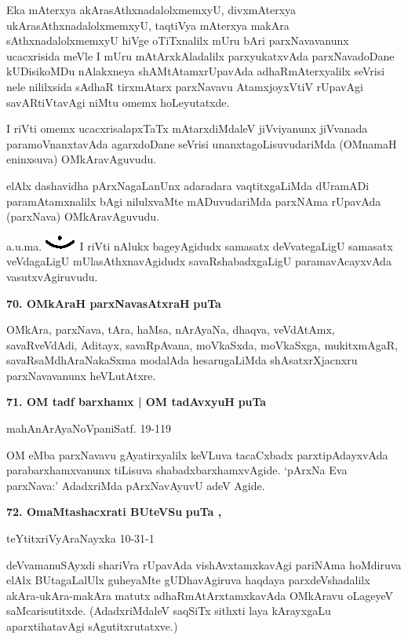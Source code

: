 \smallskip
Eka mAterxya akArasAthxnadalolxmemxyU, divxmAterxya ukArasAthxnada\-lolxmemxyU, taqtiVya mAterx\-ya makAra sAthxnadalolxmemxyU hiVge oTiTxnalilx mUru bAri parxNavavanunx ucacxrisida meVle I mUru mAtArxkAladalilx parxyukatxvAda parxNavadoDane kUDisikoMDu nAlakxneya shAMtAtamxrUpavAda adhaR\-mAterxyalilx seVrisi nele nililxsida sAdhaR tirxmAtarx parxNavavu AtamxjoyxVtiV rUpavAgi savARtiVtavAgi niMtu omemx hoLeyutatxde.

I riVti omemx ucacxrisalapxTaTx mAtarxdiMdaleV jiVviyanunx jiVvanada paramoVnanxtavAda agarxdoDane seVrisi unanxtagoLisuvudariMda (OMnamaH eninxsuva) OMkAravAguvudu.

elAlx dashavidha pArxNagaLanUnx adaradara vaqtitxgaLiMda dUramADi paramAtamxnalilx bAgi nilulxvaMte mADuvudariMda parxNAma rUpavAda (parxNava) OMkAravAguvudu.

a.u.ma. {\includegraphics[scale=.6]{fig1.eps}} I riVti nAlukx bageyAgidudx samasatx deVvategaLigU samasatx veVdagaLigU mUlasAthxna\-vAgidudx savaRshabadxgaLigU paramavAcayxvAda vasutxvAgiruvudu.

\medskip
\noindent
\textbf{70. OMkAraH parxNavasAtxraH} \hfill{\bf puTa \pageref{155}}

\smallskip
OMkAra, parxNava, tAra, haMsa, nArAyaNa, dhaqva, veVdAtAmx, savaRveVdAdi, Aditayx, savaRpAvana, moVkaSxda, moVkaSxga, mukitxmAgaR, savaRsaMdhAraNakaSxma modalAda hesarugaLiMda shAsatxrXjacnxru parxNava\-vanunx heVLutAtxre.


\medskip
\noindent
\textbf{71. OM tadf barxhamx | OM tadAvxyuH} \hfill{\bf puTa \pageref{156}}

\hfill{mahAnArAyaNoVpaniSatf. 19-119}

\smallskip
OM eMba parxNavavu gAyatirxyalilx keVLuva tacaCxbadx parxtipAdayxvAda parabarxhamxvanunx tiLisuva shabadxbarxhamx\-vAgide. `pArxNa Eva parxNava:' AdadxriMda pArxNavAyuvU adeV Agide.

\medskip
\noindent
\textbf{72. OmaMtashacxrati BUteVSu} \hfill{\bf puTa \pageref{125}, \pageref{156}}

\hfill{teYtitxriVyAraNayxka 10-31-1}

\smallskip
deVvamanuSAyxdi shariVra rUpavAda vishAvxtamxkavAgi pariNAma hoMdiruva elAlx BUtagaLalUlx guhe\-yaMte gUDhavAgiruva haqdaya parxdeVshadalilx akAra-\-ukAra-makAra matutx adhaRmAtArxtamxkavAda OMkA\-ravu oLageyeV saMcarisutitxde. (AdadxriMdaleV saqSiTx sithxti laya kArayxgaLu aparxtihatavAgi sAgutitxrutatxve.)

